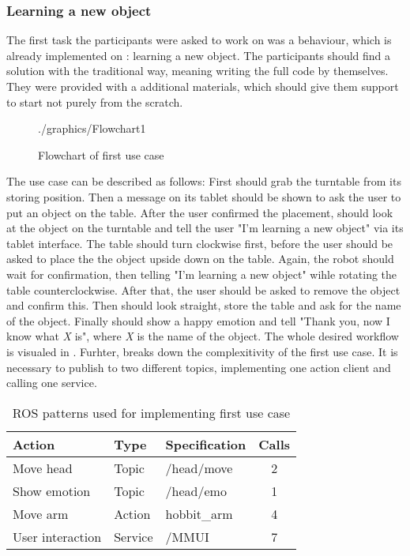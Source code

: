 \subsubsection*{Learning a new object}
The first task the participants were asked to work on was a behaviour, which is already implemented on \hobbit{}: learning a new object. The participants should find a solution with the traditional way, meaning writing the full code by themselves. They were provided with a additional materials, which should give them support to start not purely from the scratch. \\

\begin{figure}[htbp]
	\centering
	\begin{overpic}[width=\linewidth]{./graphics/Flowchart1}
	\end{overpic}
    \caption{Flowchart of first use case}%
	\label{fig:FirstUserCaseFlow}%
\end{figure}

The use case can be described as follows: First \hobbit{} should grab the turntable from its storing position. Then a message on its tablet should be shown to ask the user to put an object on the table. After the user confirmed the placement, \hobbit{} should look at the object on the turntable and tell the user "I'm learning a new object" via its tablet interface. The table should turn clockwise first, before the user should be asked to place the the object upside down on the table. Again, the robot should wait for confirmation, then telling "I'm learning a new object" wihle rotating the table counterclockwise. After that, the user should be asked to remove the object and confirm this. Then \hobbit{} should look straight, store the table and ask for the name of the object. Finally \hobbit{} should show a happy emotion and tell "Thank you, now I know what \textit{X} is", where \textit{X} is the name of the object. The whole desired workflow is visualed in . Furhter,  breaks down the complexitivity of the first use case. It is necessary to publish to two different topics, implementing one action client and calling one service.

\begin{table}
	\centering
	\begin{tabular}{l l l c}
		\toprule
        Action & Type & Specification & Calls \\
        \midrule
        Move head & Topic & /head/move  & 2 \\
        Show emotion & Topic & /head/emo  & 1 \\
        Move arm & Action & hobbit\_arm & 4 \\
        User interaction & Service & /MMUI & 7 \\
		\bottomrule
	\end{tabular}
	\caption{ROS patterns used for implementing first use case}
	\label{tab:FirstUseCaseSpecs}
\end{table}

